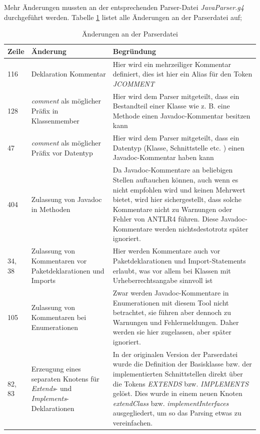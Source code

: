 Mehr Änderungen mussten an der entsprechenden Parser-Datei \textit{JavaParser.g4} durchgeführt werden.  Tabelle \ref{tab:parser_changes} listet alle Änderungen an der Parserdatei auf;
\begin{table}[h!]
    \centering
    \begin{tabular}{m{0.75cm}|m{4cm}|m{10cm}}
        Zeile & Änderung & Begründung \\
         \hline
        116 & Deklaration Kommentar & Hier wird ein mehrzeiliger Kommentar definiert, dies ist hier ein Alias für den Token \textit{JCOMMENT}\\
        \hline
        128 & \textit{comment} als möglicher Präfix in Klassenmember & Hier wird dem Parser mitgeteilt, dass ein Bestandteil einer Klasse wie z. B. eine Methode einen Javadoc-Kommentar besitzen kann\\
        \hline
        47 & \textit{comment} als möglicher Präfix vor Datentyp & Hier wird dem Parser mitgeteilt, dass ein Datentyp (Klasse, Schnittstelle etc. ) einen Javadoc-Kommentar haben kann \\
        \hline
        404 & Zulassung von Javadoc in Methoden & Da Javadoc-Kommentare an beliebigen Stellen auftauchen können, auch wenn es nicht empfohlen wird und keinen Mehrwert bietet, wird hier sichergestellt, dass solche Kommentare nicht zu Warnungen oder Fehler von ANTLR4 führen. Diese Javadoc-Kommentare werden nichtsdestotrotz später ignoriert.\\
        \hline
        34, 38& Zulassung von Kommentaren vor Paketdeklarationen und Imports & Hier werden Kommentare auch vor Paketdeklarationen und Import-Statements erlaubt, was vor allem bei Klassen mit Urheberrechtsangabe sinnvoll ist\\
        \hline
        105 & Zulassung von Kommentaren bei Enumerationen & Zwar werden Javadoc-Kommentare in Enumerationen mit diesem Tool nicht betrachtet, sie führen aber dennoch zu Warnungen und Fehlermeldungen. Daher werden sie hier zugelassen, aber später ignoriert. \\
        \hline
        82, 83 & Erzeugung eines separaten Knotens für \textit{Extends}- und \textit{Implements}-Deklarationen & In der originalen Version der Parserdatei wurde die Definition der Basisklasse bzw. der implementierten Schnittstellen direkt über die Tokens \textit{EXTENDS} bzw. \textit{IMPLEMENTS} gelöst. Dies wurde in einem neuen Knoten \textit{extendClass} bzw. \textit{implementInterfaces} ausgegliedert, um so das Parsing etwas zu vereinfachen.  \\
         \hline
    \end{tabular}
    \caption{Änderungen an der Parserdatei}
    \label{tab:parser_changes}
\end{table}

